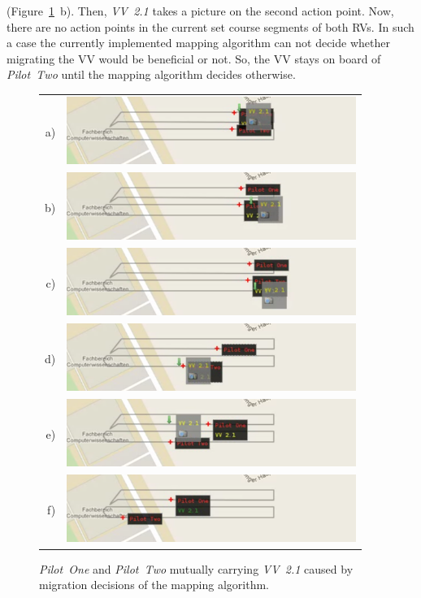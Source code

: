 (Figure~\ref{fig:demo2mig02}~b). Then, \textit{VV~2.1} takes a picture on the second action point.  
%
Now, there are no action points in the current set course segments of both \acp{RV}. In such a case
the currently implemented mapping algorithm can not decide whether migrating the \ac{VV} would be
beneficial or not. So, the \ac{VV} stays on board of \textit{Pilot~Two} until the mapping algorithm
decides otherwise.
%
\begin{figure}[h]
	\begin{center}
		\begin{tabular}{rr}
			a)&{\includegraphics[width=9.4cm]{ese-demo2-3.png}} \\
			b)&{\includegraphics[width=9.4cm]{ese-demo2-4.png}} \\
			c)&{\includegraphics[width=9.4cm]{ese-demo2-5.png}} \\
			d)&{\includegraphics[width=9.4cm]{ese-demo2-6.png}} \\
			e)&{\includegraphics[width=9.4cm]{ese-demo2-7.png}} \\
			f)&{\includegraphics[width=9.4cm]{ese-demo2-8.png}}
		\end{tabular}
	\end{center}
	\caption{\textit{Pilot~One} and \textit{Pilot~Two} mutually carrying \textit{VV~2.1}
		caused by migration decisions of the mapping algorithm.\label{fig:demo2mig02}}
\end{figure}
